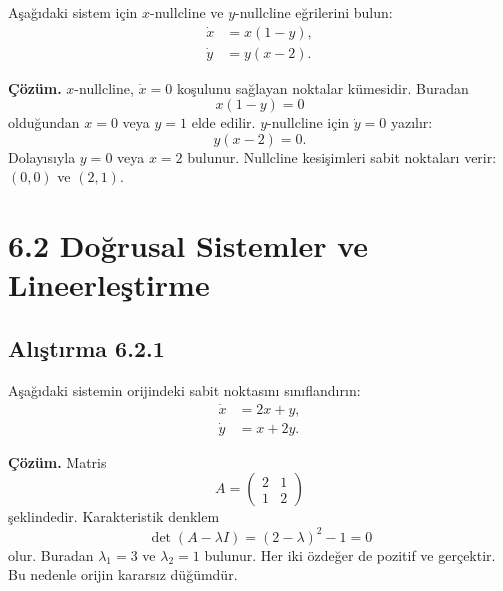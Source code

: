 \begin{justify}
Aşağıdaki sistem için $x$-nullcline ve $y$-nullcline eğrilerini bulun:
\begin{align}
\dot{x} &= x(1-y),\\
\dot{y} &= y(x-2).
\end{align}

\textbf{Çözüm.} $x$-nullcline, $\dot{x}=0$ koşulunu sağlayan noktalar kümesidir. Buradan
\begin{equation}
x(1-y)=0
\end{equation}
olduğundan $x=0$ veya $y=1$ elde edilir. $y$-nullcline için $\dot{y}=0$ yazılır:
\begin{equation}
y(x-2)=0.
\end{equation}
Dolayısıyla $y=0$ veya $x=2$ bulunur. Nullcline kesişimleri sabit noktaları verir: $(0,0)$ ve $(2,1)$.
\end{justify}

\section*{6.2 Doğrusal Sistemler ve Lineerleştirme}

\subsection*{Alıştırma 6.2.1}

\begin{justify}
Aşağıdaki sistemin orijindeki sabit noktasını sınıflandırın:
\begin{align}
\dot{x} &= 2x+y,\\
\dot{y} &= x+2y.
\end{align}

\textbf{Çözüm.} Matris
\begin{equation}
A=\begin{pmatrix}2&1\\1&2\end{pmatrix}
\end{equation}
şeklindedir. Karakteristik denklem
\begin{equation}
\det(A-\lambda I)=(2-\lambda)^2-1=0
\end{equation}
olur. Buradan $\lambda_1=3$ ve $\lambda_2=1$ bulunur. Her iki özdeğer de pozitif ve gerçektir. Bu nedenle orijin kararsız düğümdür.
\end{justify}

